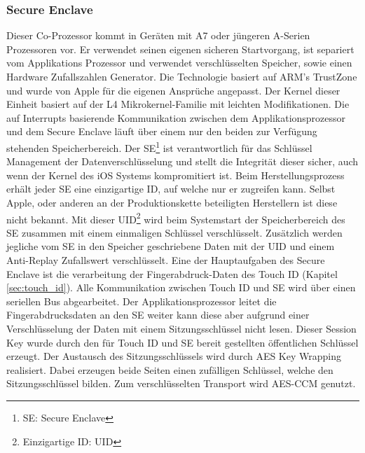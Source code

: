 	\subsubsection{Secure Enclave}\label{sec:secure_enclave}
		Dieser Co-Prozessor kommt in Geräten mit A7 oder jüngeren A-Serien Prozessoren
		vor. Er verwendet seinen eigenen sicheren Startvorgang, ist separiert vom
		Applikations Prozessor und verwendet verschlüsselten Speicher, sowie einen
		Hardware Zufallszahlen Generator. Die Technologie basiert auf ARM's
		TrustZone\cite{TrustZone2015}
		und wurde von Apple für die eigenen Ansprüche angepasst. Der Kernel dieser
		Einheit basiert auf der L4
		Mikrokernel-Familie\cite{L4MicroKernel2015} mit leichten
		Modifikationen. Die auf Interrupts basierende Kommunikation zwischen dem
		Applikationsprozessor und dem Secure Enclave läuft über einem nur den beiden zur Verfügung stehenden Speicherbereich.
		Der SE\footnote{SE: Secure Enclave} ist verantwortlich für das Schlüssel
		Management der Datenverschlüsselung und stellt die Integrität dieser sicher, auch wenn der
		Kernel des iOS Systems kompromitiert ist. Beim Herstellungsprozess erhält
		jeder SE eine einzigartige ID, auf welche nur er zugreifen kann. Selbst Apple,
		oder anderen an der Produktionskette beteiligten Herstellern ist diese nicht bekannt.
		Mit dieser UID\footnote{Einzigartige ID: UID} wird beim Systemstart der
		Speicherbereich des SE zusammen mit einem einmaligen Schlüssel verschlüsselt.
		Zusätzlich werden jegliche vom SE in den Speicher geschriebene Daten mit der
		UID und einem Anti-Replay Zufallswert verschlüsselt. Eine der Hauptaufgaben
		des Secure Enclave ist die verarbeitung der Fingerabdruck-Daten des Touch ID
		(Kapitel \ref{sec:touch_id}).
		Alle Kommunikation zwischen Touch ID und SE wird über einen seriellen Bus
		abgearbeitet. Der Applikationsprozessor leitet die Fingerabdrucksdaten an den
		SE weiter kann diese aber aufgrund einer Verschlüsselung der Daten mit einem
		Sitzungsschlüssel nicht lesen. Dieser Session Key wurde durch den für Touch
		ID und SE bereit gestellten öffentlichen Schlüssel erzeugt. Der Austausch des
		Sitzungsschlüssels wird durch AES Key Wrapping realisiert. Dabei erzeugen
		beide Seiten einen zufälligen Schlüssel, welche den Sitzungsschlüssel bilden.
		Zum verschlüsselten Transport wird AES-CCM genutzt.
